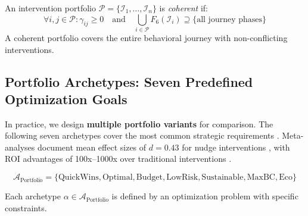 \begin{proposition}
An intervention portfolio $\mathcal{P} = \{\mathcal{I}_1, \ldots, \mathcal{I}_n\}$ is \textit{coherent} if:
\begin{equation}
\forall i, j \in \mathcal{P}: \gamma_{ij} \geq 0 \quad \text{and} \quad \bigcup_{i \in \mathcal{P}} F_6(\mathcal{I}_i) \supseteq \{\text{all journey phases}\}
\end{equation}
A coherent portfolio covers the entire behavioral journey with non-conflicting interventions.
\end{proposition}


\subsection{Portfolio Archetypes: Seven Predefined Optimization Goals}
\label{sec:hhh-portfolio-archetypes}

\begin{tcolorbox}[colback=purple!5!white, colframe=purple!75!black,
    title=\textbf{Definition HHH-D6: Portfolio Archetypes}]

In practice, we design \textbf{multiple portfolio variants} for comparison. The following seven archetypes cover the most common strategic requirements \citep{hummel2019effective, szaszi2018systematic}. Meta-analyses document mean effect sizes of $d = 0.43$ for nudge interventions \citep{hummel2019effective}, with ROI advantages of 100x--1000x over traditional interventions \citep{benartzi2017should}.

\begin{equation}
\mathcal{A}_{\text{Portfolio}} = \{\text{QuickWins}, \text{Optimal}, \text{Budget}, \text{LowRisk}, \text{Sustainable}, \text{MaxBC}, \text{Eco}\}
\end{equation}

Each archetype $\alpha \in \mathcal{A}_{\text{Portfolio}}$ is defined by an optimization problem with specific constraints.
\end{tcolorbox}

